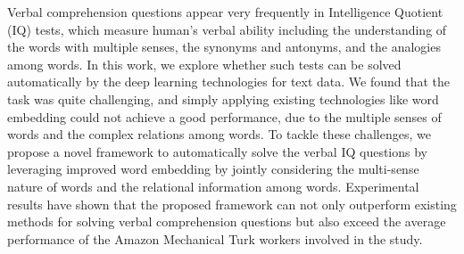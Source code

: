 Verbal comprehension questions appear very frequently in Intelligence Quotient (IQ) tests, which measure human's verbal ability including the understanding of the words with multiple senses, the synonyms and antonyms, and the analogies among words. In this work, we explore whether such tests can be solved automatically by the deep learning technologies for text data. We found that the task was quite challenging, and simply applying existing technologies like word embedding could not achieve a good performance, due to the multiple senses of words and the complex relations among words. To tackle these challenges, we propose a novel framework to automatically solve the verbal IQ questions by leveraging improved word embedding by jointly considering the multi-sense nature of words and the relational information among words. Experimental results have shown that the proposed framework can not only outperform existing methods for solving verbal comprehension questions but also exceed the average performance of the Amazon Mechanical Turk workers involved in the study.
